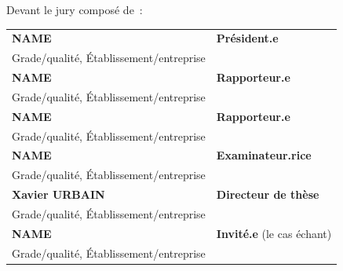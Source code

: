 \begin{titlepage}
\begin{center}
    \vspace{0.5cm}
    
    \end{center}
    
    Devant le jury composé de~:\\
    
    \small {
    \begin{tabular}{ll}
    \textbf{NAME}           &\textbf{Président.e}\\
      Grade/qualité, Établissement/entreprise\\
    \textbf{NAME}           &\textbf{Rapporteur.e}\\
      Grade/qualité, Établissement/entreprise\\
    \textbf{NAME}           &\textbf{Rapporteur.e}\\
      Grade/qualité, Établissement/entreprise\\
    \textbf{NAME}           &\textbf{Examinateur.rice}\\
      Grade/qualité, Établissement/entreprise\\
    \textbf{Xavier URBAIN}           &\textbf{Directeur de thèse}\\
      Grade/qualité, Établissement/entreprise\\
    \textbf{NAME}     &\textbf{Invité.e} (le cas échant)\\
      Grade/qualité, Établissement/entreprise\\
    \end{tabular}
    }
    
    
    \end{titlepage}